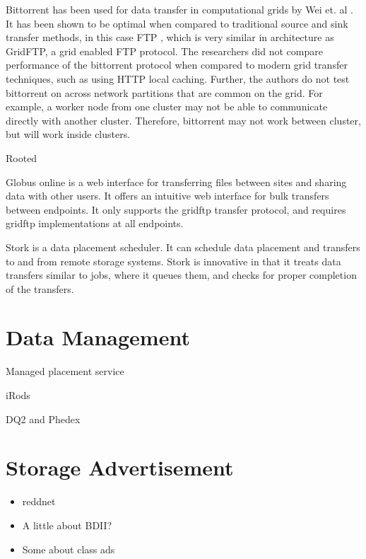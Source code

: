 Bittorrent has been used for data transfer in computational grids by Wei et. al \cite{wei2005collaborative, wei2005scheduling, wei2007towards}.  It has been shown to be optimal when compared to traditional source and sink transfer methods, in this case FTP \cite{postel1985file}, which is very similar in architecture as GridFTP, a grid enabled FTP protocol.  The researchers did not compare performance of the bittorrent protocol when compared to modern grid transfer techniques, such as using HTTP local caching.  Further, the authors do not test bittorrent on across network partitions that are common on the grid.  For example, a worker node from one cluster may not be able to communicate directly with another cluster.  Therefore, bittorrent may not work between cluster, but will work inside clusters.

Rooted

Globus online \cite{foster2011globus} is a web interface for transferring files between sites and sharing data with other users.  It offers an intuitive web interface for bulk transfers between endpoints.  It only supports the gridftp \cite{allcock2005globus} transfer protocol, and requires gridftp implementations at all endpoints.

Stork \cite{kosar2004stork} is a data placement scheduler.  It can schedule data placement and transfers to and from remote storage systems.  Stork is innovative in that it treats data transfers similar to jobs, where it queues them, and checks for proper completion of the transfers.

\section{Data Management}

Managed placement service

iRods 

DQ2 and Phedex

\section{Storage Advertisement}

\begin{itemize}
\item reddnet
\item A little about BDII?
\item Some about class ads
\end{itemize}




